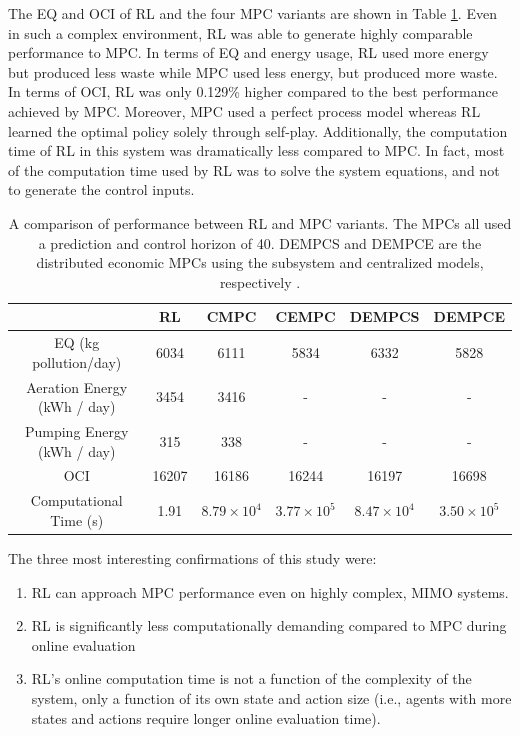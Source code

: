 The EQ and OCI of RL and the four MPC variants are shown in Table \ref{tab:04rl_vs_mpcs}.  Even in such a complex environment, RL was able to generate highly comparable performance to MPC. In terms of EQ and energy usage, RL used more energy but produced less waste while MPC used less energy, but produced more waste.  In terms of OCI, RL was only 0.129\% higher compared to the best performance achieved by MPC.  Moreover, MPC used a perfect process model whereas RL learned the optimal policy solely through self-play.  Additionally, the computation time of RL in this system was dramatically less compared to MPC. In fact, most of the computation time used by RL was to solve the system equations, and not to generate the control inputs. 

\begin{table}[H]
\footnotesize
\caption{A comparison of performance between RL and MPC variants. The MPCs all used a prediction and control horizon of 40.  DEMPCS and DEMPCE are the distributed economic MPCs using the subsystem and centralized models, respectively \cite{an_mpc}.}
\centering
\begin{tabular}{c|c|c|c|c|c}
                         &\textbf{RL}     & \textbf{CMPC} & \textbf{CEMPC} & \textbf{DEMPCS} & \textbf{DEMPCE}\\
\hline
EQ (kg pollution/day)  	 &   6034                 & 6111                     &   5834                    &  6332           &	5828	 \\
Aeration Energy (kWh / day) &  3454      &   3416                     &   -       &    -   &	-	 \\
Pumping Energy (kWh / day)  & 315   &   338                     &   -       &   -    &	-	 \\
OCI                       & 16207   &   16186       & 16244         &   16197    &	16698	 \\
Computational Time (s)     &  1.91  &  $8.79 \times 10^4$     &    $3.77 \times 10^5$    &   $8.47 \times 10^4$   &	 $3.50 \times 10^5$	
\label{tab:04rl_vs_mpcs}
\end{tabular}
\end{table}

The three most interesting confirmations of this study were:
\begin{enumerate}
    \item RL can approach MPC performance even on highly complex, MIMO systems.
    \item RL is significantly less computationally demanding compared to MPC during online evaluation
    \item RL's online computation time is not a function of the complexity of the system, only a function of its own state and action size (i.e., agents with more states and actions require longer online evaluation time).
\end{enumerate}











